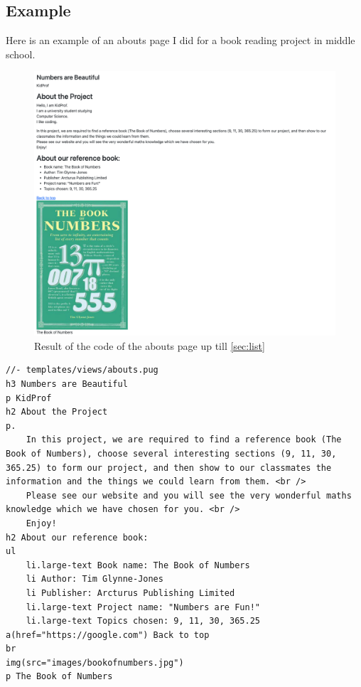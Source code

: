 \subsection*{Example}

Here is an example of an abouts page I did for a book reading project in middle school.

\begin{figure}[h]
\centering
\includegraphics[width=15cm]{images/ch5-finalproduct.png}
\caption{Result of the code of the abouts page up till \cref{sec:list}}
\end{figure}

\begin{lstlisting}[language=pug]
//- templates/views/abouts.pug
h3 Numbers are Beautiful
p KidProf
h2 About the Project
p.
    In this project, we are required to find a reference book (The Book of Numbers), choose several interesting sections (9, 11, 30, 365.25) to form our project, and then show to our classmates the information and the things we could learn from them. <br />
    Please see our website and you will see the very wonderful maths knowledge which we have chosen for you. <br />
    Enjoy!
h2 About our reference book:
ul
    li.large-text Book name: The Book of Numbers
    li Author: Tim Glynne-Jones
    li Publisher: Arcturus Publishing Limited
    li.large-text Project name: "Numbers are Fun!"
    li.large-text Topics chosen: 9, 11, 30, 365.25
a(href="https://google.com") Back to top
br
img(src="images/bookofnumbers.jpg")
p The Book of Numbers
\end{lstlisting}

